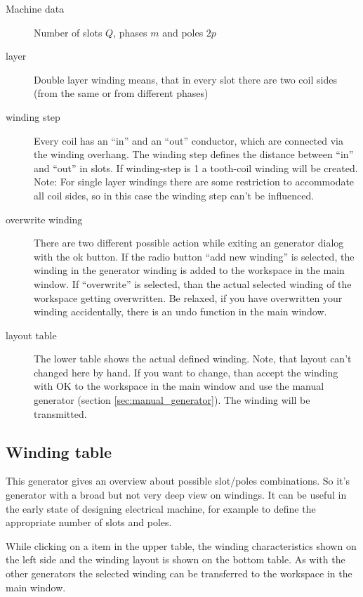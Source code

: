 \documentclass[]{scrreprt}
\begin{document}
\begin{description}
 \item[Machine data] Number of slots $Q$, phases $m$ and poles $2p$ 
 \item[layer] Double layer winding means, that in every slot there are two coil sides (from the same
      or from different phases)
 \item[winding step] Every coil has an "`in"' and an "`out"' conductor, which are connected via 
       the winding overhang. The winding step defines the distance between "`in"' and "`out"' in slots.
       If winding-step is 1 a tooth-coil winding will be created. Note: For single layer windings 
       there are some restriction to accommodate all coil sides, so in this case the winding step
       can't be influenced.       
 \item[overwrite winding] There are two different possible action while exiting an generator dialog with
          the ok button. If the radio button "`add new winding"' is selected, the winding in the generator
          winding is added to the workspace in the main window. If "`overwrite"' is selected, than the 
          actual selected winding of the workspace getting overwritten. Be relaxed, if you have overwritten
          your winding accidentally, there is an undo function in the main window.
 \item[layout table] The lower table shows the actual defined winding. Note, that layout can't changed here
          by hand. If you want to change, than accept the winding with OK to the workspace in the main window
          and use the manual generator (section \ref{sec:manual_generator}). The winding will be transmitted.
\end{description}
%
%
\FloatBarrier
\subsection{Winding table}
%
This generator gives an overview about possible slot/poles combinations. So it's generator
with a broad but not very deep view on windings. It can be useful
in the early state of designing electrical machine, for example to define the appropriate
number of slots and poles.

While clicking on a item in the upper
table, the winding characteristics shown on the left side and the winding layout is
shown on the bottom table. As with the other generators the selected winding can be transferred to the workspace in the main window.
\end{document}
